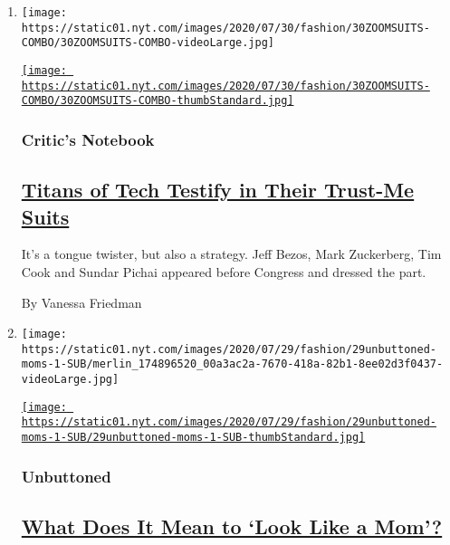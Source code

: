 \begin{enumerate}
\def\labelenumi{\arabic{enumi}.}
\item
  \texttt{[image: https://static01.nyt.com/images/2020/07/30/fashion/30ZOOMSUITS-COMBO/30ZOOMSUITS-COMBO-videoLarge.jpg]}

  \href{/2020/07/29/style/Bezos-zuckerberg-cook-pichai-testimony-suits.html}{\texttt{[image: https://static01.nyt.com/images/2020/07/30/fashion/30ZOOMSUITS-COMBO/30ZOOMSUITS-COMBO-thumbStandard.jpg]}}

  \hypertarget{critics-notebook}{%
  \subsubsection{Critic's Notebook}\label{critics-notebook}}

  \hypertarget{titans-of-tech-testify-in-their-trust-me-suits}{%
  \subsection{\texorpdfstring{\href{/2020/07/29/style/Bezos-zuckerberg-cook-pichai-testimony-suits.html}{Titans
  of Tech Testify in Their Trust-Me
  Suits}}{Titans of Tech Testify in Their Trust-Me Suits}}\label{titans-of-tech-testify-in-their-trust-me-suits}}

  It's a tongue twister, but also a strategy. Jeff Bezos, Mark
  Zuckerberg, Tim Cook and Sundar Pichai appeared before Congress and
  dressed the part.

  By Vanessa Friedman
\item
  \texttt{[image: https://static01.nyt.com/images/2020/07/29/fashion/29unbuttoned-moms-1-SUB/merlin\_174896520\_00a3ac2a-7670-418a-82b1-8ee02d3f0437-videoLarge.jpg]}

  \href{/2020/07/28/style/wall-of-moms-image.html}{\texttt{[image: https://static01.nyt.com/images/2020/07/29/fashion/29unbuttoned-moms-1-SUB/29unbuttoned-moms-1-SUB-thumbStandard.jpg]}}

  \hypertarget{unbuttoned}{%
  \subsubsection{Unbuttoned}\label{unbuttoned}}

  \hypertarget{what-does-it-mean-to-look-like-a-mom}{%
  \subsection{\texorpdfstring{\href{/2020/07/28/style/wall-of-moms-image.html}{What
  Does It Mean to `Look Like a
  Mom'?}}{What Does It Mean to `Look Like a Mom'?}}\label{what-does-it-mean-to-look-like-a-mom}}


\end{enumerate}
